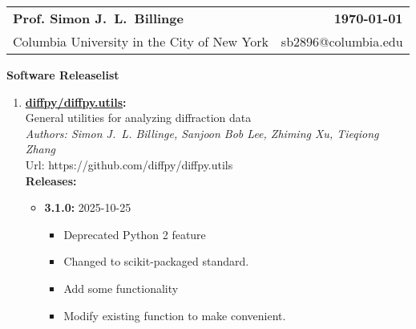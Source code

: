 \documentclass[prl,tighten,amsmath,amssymb,floatfix]{revtex4-1}
\begin{document}
\noindent
\colorbox{gray!40}{%
  \begin{tabular*}{7in}{l@{\extracolsep{\fill}}r}
  \textbf{\Large Prof. Simon J.~L.~Billinge} & \textbf{\today} \\
  Columbia University in the City of New York & sb2896@columbia.edu \\
  \end{tabular*}%
}\vspace{1em}

\textbf{Software Releaselist}


\begin{enumerate}
  \item \textbf{\href{https://github.com/diffpy/diffpy.utils}{diffpy/diffpy.utils}:}\\
  \hspace*{1em}General utilities for analyzing diffraction data\\
  \hspace*{1em}\textit{Authors: Simon J.~L. Billinge, Sanjoon Bob Lee, Zhiming Xu, Tieqiong Zhang}\\
  \hspace*{1em}Url: https://github.com/diffpy/diffpy.utils\\
  \hspace*{1em}\textbf{Releases:}\vspace{-0.5em}
  \begin{itemize}[label={}]
    \item \textbf{3.1.0:} 2025-10-25
      \begin{itemize}[label={}, leftmargin=2em]
        \item Deprecated Python 2 feature
        \item Changed to scikit-packaged standard.
        \item Add some functionality
        \item Modify existing function to make convenient.
      \end{itemize}
  \end{itemize}


\end{enumerate}
\end{document}
